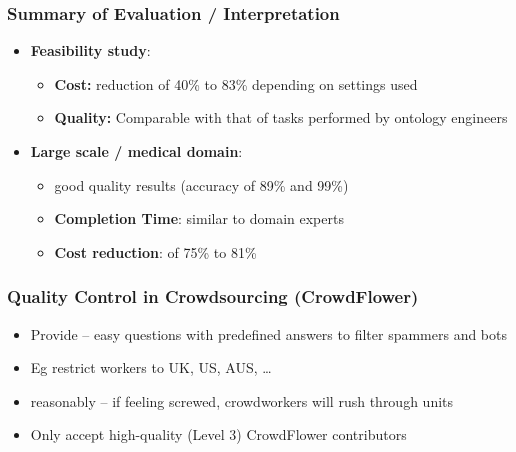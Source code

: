 \documentclass{beamer}
\begin{document}
\begin{frame}
  \frametitle{Summary of Evaluation / Interpretation}
  \begin{itemize}
        \item \textbf{Feasibility study}:
            \begin{itemize}
                \item \textbf{Cost:} reduction of 40\% to 83\% depending on settings used 
                \item \textbf{Quality:} Comparable with that of tasks performed by ontology engineers 
            \end{itemize}
\vspace{0.5cm}
        \item \textbf{Large scale / medical domain}:
            \begin{itemize}
                \item good quality results (accuracy of 89\% and 99\%)
                \item \textbf{Completion Time}: similar to domain experts 
                \item \textbf{Cost reduction}: of 75\% to 81\% 
            \end{itemize}
  \end{itemize}
\end{frame}

\begin{frame}
  \frametitle{Quality Control in Crowdsourcing (CrowdFlower)}
  \begin{itemize}
        \item Provide  -- easy questions with predefined answers to filter spammers and bots 
        \item {} Eg restrict workers to UK, US, AUS, \dots 
        \item {} reasonably -- if feeling screwed, crowdworkers will rush through units
        \item Only accept high-quality (Level 3) CrowdFlower contributors
  \end{itemize}
\end{frame}
\end{document}
